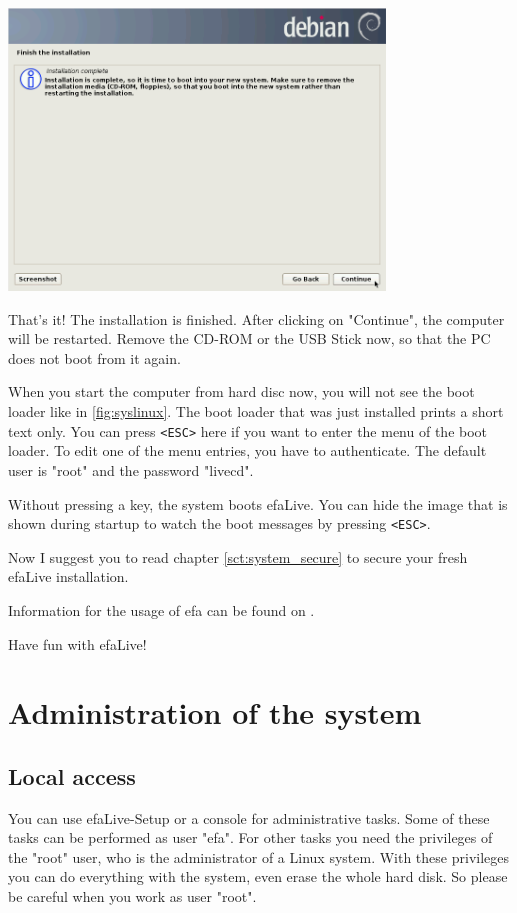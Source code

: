 \documentclass[a4paper,12pt,twoside]{article}
\begin{document}
\bigskip
\begin{minipage}{\linewidth}
    \centering
    \includegraphics[width=10cm]{efaLiveen-img/efaLiveen-img19.png}
    \label{fig:finish}
\end{minipage}
\bigskip

That's it! The installation is finished. After clicking
on "Continue", the computer will be
restarted. Remove the CD-ROM or the USB Stick now, so that the PC does
not boot from it again.

When you start the computer from hard disc now, you will not see the
boot loader like in \ref{fig:syslinux}. The boot loader that was just
installed prints a short text only. You can press
\texttt{{\textless}ESC{\textgreater}} here if you want to enter the menu of the
boot loader. To edit one of the menu entries, you have to authenticate.
The default user is "root" and the password "livecd".

Without pressing a key, the system boots efaLive. You can hide the image
that is shown during startup to watch the boot messages by pressing
\texttt{{\textless}ESC{\textgreater}}.

Now I suggest you to read chapter \ref{sct:system_secure} to
secure your fresh efaLive installation.

\bigskip
Information for the usage of efa can be found on \cite{EFA2}.

\bigskip
Have fun with efaLive!


\section{Administration of the system}
\label{sct:administration}
\subsection{Local access}
\label{sct:local_access}
You can use efaLive-Setup or a console for
administrative tasks. Some of these tasks can be performed as user
"efa". For other tasks you need the
privileges of the "root" user, who is the
administrator of a Linux system. With these privileges you can do
everything with the system, even erase the whole hard disk. So please
be careful when you work as user "root".
\end{document}
